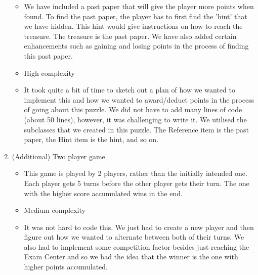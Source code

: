 \documentclass[11pt]{article}
\begin{document}
\begin{enumerate}
        \begin{itemize}
        \item We have included a past paper that will give the player more points when found. To find the past paper, the player has to first find the 'hint' that we have hidden. This hint would give instructions on how to reach the treasure. The treasure is the past paper. We have also added certain enhancements such as gaining and losing points in the process of finding this past paper.
        \item High complexity
        \item It took quite a bit of time to sketch out a plan of how we wanted to implement this and how we wanted to award/deduct points in the process of going about this puzzle. We did not have to add many lines of code (about 50 lines), however, it was challenging to write it. We utilised the subclasses that we created in this puzzle. The Reference item is the past paper, the Hint item is the hint, and so on.
	\end{itemize}
 \item (Additional) Two player game
        \begin{itemize}
        \item This game is played by 2 players, rather than the initially intended one. Each player gets 5 turns before the other player gets their turn. The one with the higher score accumulated wins in the end. 
        \item Medium complexity
        \item It was not hard to code this. We just had to create a new player and then figure out how we wanted to alternate between both of their turns. We also had to implement some competition factor besides just reaching the Exam Center and so we had the idea that the winner is the one with higher points accumulated.
        \end{itemize}


\end{enumerate}
\end{document}
